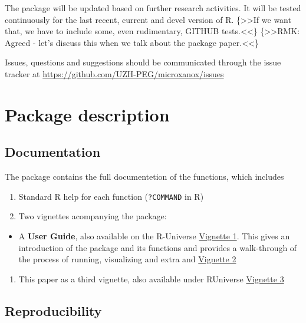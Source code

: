 \documentclass[]{elsarticle} %
\providecommand{\tightlist}{%
  \setlength{\itemsep}{0pt}\setlength{\parskip}{0pt}}
\begin{document}
The package will be updated based on further research activities. It
will be tested continuously for the last recent, current and devel
version of R. {\{\textgreater\textgreater If we want that, we have to
include some, even rudimentary, GITHUB tests.\textless\textless\}
\{\textgreater\textgreater RMK: Agreed - let's discuss this when we talk
about the package paper.\textless\textless\} }

Issues, questions and suggestions should be communicated through the
issue tracker at \url{https://github.com/UZH-PEG/microxanox/issues}

\hypertarget{package-description}{%
\section{Package description}\label{package-description}}

\hypertarget{documentation}{%
\subsection{Documentation}\label{documentation}}

The package contains the full documentetion of the functions, which
includes

\begin{enumerate}
\def\labelenumi{\arabic{enumi}.}
\tightlist
\item
  Standard R help for each function (\texttt{?COMMAND} in R)
\item
  Two vignettes acompanying the package:
\end{enumerate}

\begin{itemize}
\tightlist
\item
  A \textbf{User Guide}, also available on the R-Universe
  \href{@LINK_NEEDED}{Vignette 1}. This gives an introduction of the
  package and its functions and provides a walk-through of the process
  of running, visualizing and extra and \href{@LINK_NEEDED}{Vignette 2}
\end{itemize}

\begin{enumerate}
\def\labelenumi{\arabic{enumi}.}
\setcounter{enumi}{2}
\tightlist
\item
  This paper as a third vignette, also available under RUniverse
  \href{@LINK_NEEDED}{Vignette 3}
\end{enumerate}

\hypertarget{reproducibility}{%
\subsection{Reproducibility}\label{reproducibility}}
\end{document}
